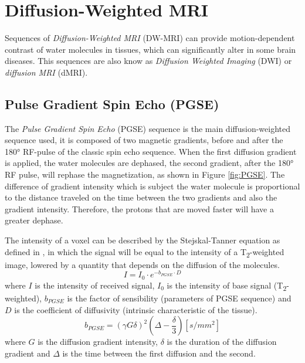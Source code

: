 \section{Diffusion-Weighted MRI}
 Sequences of \emph{Diffusion-Weighted MRI} (DW-MRI) can provide motion-dependent contrast of water molecules in tissues, which can significantly alter in some brain diseases. This sequences are also know as \emph{Diffusion Weighted Imaging} (DWI) or \emph{diffusion MRI} (dMRI). 
 \subsection{Pulse Gradient Spin Echo (PGSE)}
 The \emph{Pulse Gradient Spin Echo} (PGSE) sequence is the main diffusion-weighted sequence used, it is composed of two magnetic gradients, before and after the 180° RF-pulse of the classic spin echo sequence. When the first diffusion gradient is applied, the water molecules are dephased, the second gradient, after the 180° RF pulse, will rephase the magnetization, as shown in Figure \ref{fig:PGSE}. The difference of gradient intensity which is subject the water molecule is proportional to the distance traveled on the time between the two gradients and also the gradient intensity. Therefore, the protons that are moved faster will have a greater dephase.\cite{elementiRisonanza}

 The intensity of a voxel can be described by the Stejskal-Tanner equation as defined in \cite{dtiBook}, in which the signal will be equal to the intensity of a T\textsubscript{2}-weighted image, lowered by a quantity that depends on the diffusion of the molecules.
 \begin{equation}
    I = I_0 \cdot e^{-b_{PGSE} \cdot D}
 \end{equation}
 where $I$ is the intensity of received signal, $I_0$ is the intensity of base signal (T\textsubscript{2}-weighted), $b_{PGSE}$ is the factor of sensibility (parameters of PGSE sequence) and $D$ is the coefficient of diffusivity (intrinsic characteristic of the tissue).
 \begin{equation}
    b_{PGSE} = (\gamma G \delta)^{2}(\Delta - \frac{\delta}{3}) [s/mm^2]
 \end{equation}
 where $G$ is the diffusion gradient intensity, $\delta$ is the duration of the diffusion gradient and $\Delta$ is the time between the first diffusion and the second.

